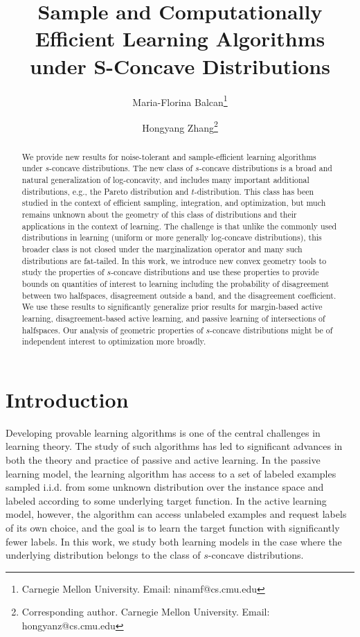 \documentclass[11pt]{article}
\title{Sample and Computationally Efficient Learning Algorithms under S-Concave Distributions}
\author{Maria-Florina Balcan\thanks{Carnegie Mellon University. Email: ninamf@cs.cmu.edu} \and
Hongyang Zhang\thanks{Corresponding author. Carnegie Mellon University. Email: hongyanz@cs.cmu.edu}
}
\date{}
\begin{document}
\maketitle

\begin{abstract}
We provide new results for noise-tolerant and sample-efficient learning algorithms under $s$-concave distributions. The new class of $s$-concave distributions is a broad and natural generalization of log-concavity, and includes many important additional distributions, e.g., the Pareto distribution and $t$-distribution. This class has been studied in the context of efficient sampling, integration, and optimization, but  much remains unknown about the geometry of this class of distributions and their applications in the context of learning. The challenge is that unlike the commonly used distributions in learning (uniform or more generally log-concave distributions), this broader class is not closed under the marginalization operator and many such distributions are fat-tailed. In this work, we introduce new convex geometry tools to study the properties of $s$-concave distributions and use these properties to provide bounds on quantities of interest to learning including the probability of disagreement between two halfspaces, disagreement outside a band, and the disagreement coefficient. We use these results to significantly generalize prior results for margin-based active learning, disagreement-based active learning, and passive learning of intersections of halfspaces. Our analysis of geometric properties of $s$-concave distributions might be of independent interest to optimization more broadly.
\end{abstract}






\section{Introduction}
Developing provable learning algorithms is one of the central challenges in learning theory. The study of such algorithms has led to significant advances in both the theory and practice of passive and active learning. In the passive learning model, the learning algorithm has access to a set of labeled examples sampled i.i.d. from some unknown distribution over the instance space and labeled according to some underlying target function. In the active learning model, however, the algorithm can access unlabeled examples and request labels of its own choice, and the goal is to learn the target function with significantly fewer labels. In this work, we study both learning models in the case where the underlying distribution belongs to the class of $s$-concave distributions.
\end{document}
